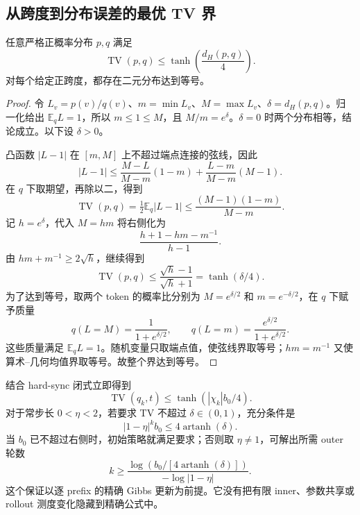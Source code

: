 \documentclass[lang=cn,scheme=chinese,openany]{../book/elegantbook}
\newcommand{\E}{\mathbb E}
\newcommand{\TV}{\operatorname{TV}}
\begin{document}
\subsection{从跨度到分布误差的最优 TV 界}

\begin{theorem}
\label{dyn:thm:hs-sharp-tv}
任意严格正概率分布 $p,q$ 满足
\begin{equation}\label{dyn:eq:hs-sharp-tv}
 \TV(p,q)\leq\tanh\!\left(\frac{d_H(p,q)}4\right).
\end{equation}
对每个给定正跨度，都存在二元分布达到等号。
\end{theorem}

\begin{proof}
令 $L_v=p(v)/q(v)$、$m=\min L_v$、$M=\max L_v$、$\delta=d_H(p,q)$。归一化给出 $\E_qL=1$，所以 $m\leq1\leq M$，且 $M/m=e^\delta$。$\delta=0$ 时两个分布相等，结论成立。以下设 $\delta>0$。

凸函数 $|L-1|$ 在 $[m,M]$ 上不超过端点连接的弦线，因此
\begin{equation*}
 |L-1|\leq\frac{M-L}{M-m}(1-m)
 +\frac{L-m}{M-m}(M-1).
\end{equation*}
在 $q$ 下取期望，再除以二，得到
\begin{equation*}
 \TV(p,q)=\tfrac12\E_q|L-1|
 \leq\frac{(M-1)(1-m)}{M-m}.
\end{equation*}
记 $h=e^\delta$，代入 $M=hm$ 将右侧化为
\begin{equation*}
 \frac{h+1-hm-m^{-1}}{h-1}.
\end{equation*}
由 $hm+m^{-1}\geq2\sqrt h$，继续得到
\begin{equation*}
 \TV(p,q)\leq\frac{\sqrt h-1}{\sqrt h+1}
 =\tanh(\delta/4).
\end{equation*}
为了达到等号，取两个 token 的概率比分别为 $M=e^{\delta/2}$ 和 $m=e^{-\delta/2}$，在 $q$ 下赋予质量
\begin{equation*}
 q(L=M)=\frac1{1+e^{\delta/2}},\qquad
 q(L=m)=\frac{e^{\delta/2}}{1+e^{\delta/2}}.
\end{equation*}
这些质量满足 $\E_qL=1$。随机变量只取端点值，使弦线界取等号；$hm=m^{-1}$ 又使算术--几何均值界取等号。故整个界达到等号。
\end{proof}

结合 hard-sync 闭式立即得到
\begin{equation*}
 \TV(q_k,t)\leq\tanh(|\chi_k|b_0/4).
\end{equation*}
对于常步长 $0<\eta<2$，若要求 TV 不超过 $\delta\in(0,1)$，充分条件是
\begin{equation*}
 |1-\eta|^k b_0\leq4\operatorname{artanh}(\delta).
\end{equation*}
当 $b_0$ 已不超过右侧时，初始策略就满足要求；否则取 $\eta\neq1$，可解出所需 outer 轮数
\begin{equation*}
 k\geq
 \frac{\log\!\left(b_0/[4\operatorname{artanh}(\delta)]\right)}
 {-\log|1-\eta|}.
\end{equation*}
这个保证以逐 prefix 的精确 Gibbs 更新为前提。它没有把有限 inner、参数共享或 rollout 测度变化隐藏到精确公式中。
\end{document}
